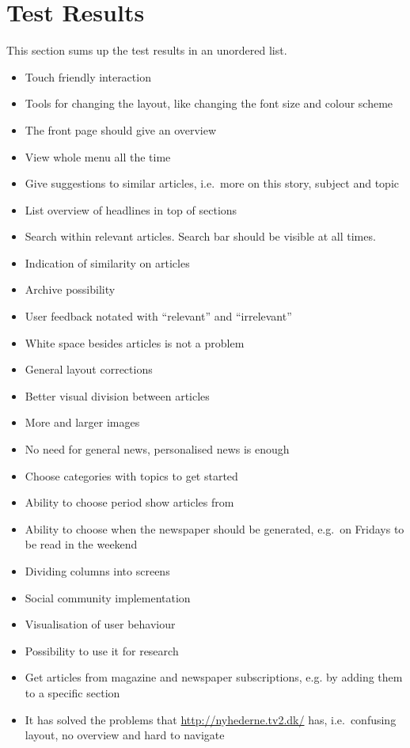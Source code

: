 \section{Test Results}
\label{sec:test_results}
This section sums up the test results in an unordered list.
\begin{itemize}
 \item Touch friendly interaction
 \item Tools for changing the layout, like changing the font size and colour scheme
 \item The front page should give an overview
 \item View whole menu all the time
 \item Give suggestions to similar articles, i.e.\ more on this story, subject and topic
 \item List overview of headlines in top of sections
 \item Search within relevant articles. Search bar should be visible at all times.
 \item Indication of similarity on articles
 \item Archive possibility
 \item User feedback notated with ``relevant'' and ``irrelevant''
 \item White space besides articles is not a problem
 \item General layout corrections
 \item Better visual division between articles
 \item More and larger images
 \item No need for general news, personalised news is enough
 \item Choose categories with topics to get started
 \item Ability to choose period show articles from
 \item Ability to choose when the newspaper should be generated, e.g.\ on Fridays to be read in the weekend
 \item Dividing columns into screens
 \item Social community implementation
 \item Visualisation of user behaviour
 \item Possibility to use it for research
 \item Get articles from magazine and newspaper subscriptions, e.g. by adding them to a specific section
 \item It has solved the problems that \url{http://nyhederne.tv2.dk/} has, i.e.\ confusing layout, no overview and hard to navigate
\end{itemize}